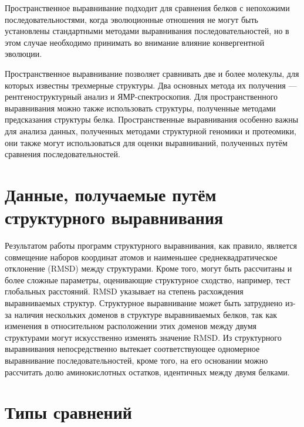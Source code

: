 \documentclass[a4paper]{extreport}
\begin{document}
Пространственное выравнивание подходит для сравнения белков с непохожими последовательностями, когда эволюционные отношения не могут быть установлены стандартными методами выравнивания последовательностей, но в этом случае необходимо принимать во внимание влияние конвергентной эволюции.

Пространственное выравнивание позволяет сравнивать две и более молекулы, для которых известны трехмерные структуры. Два основных метода их получения — рентгеноструктурный анализ и ЯМР-спектроскопия. Для пространственного выравнивания можно также использовать структуры, полученные методами предсказания структуры белка. Пространственные выравнивания особенно важны для анализа данных, полученных методами структурной геномики и протеомики, они также могут использоваться для оценки выравниваний, полученных путём сравнения последовательностей. 

\section{Данные, получаемые путём структурного выравнивания}

Результатом работы программ структурного выравнивания, как правило, является совмещение наборов координат атомов и наименьшее среднеквадратическое отклонение (RMSD) между структурами. Кроме того, могут быть рассчитаны и более сложные параметры, оценивающие структурное сходство, например, тест глобальных расстояний. RMSD указывает на степень расхождения выравниваемых структур. Структурное выравнивание может быть затруднено из-за наличия нескольких доменов в структуре выравниваемых белков, так как изменения в относительном расположении этих доменов между двумя структурами могут искусственно изменять значение RMSD. Из структурного выравнивания непосредственно вытекает соответствующее одномерное выравнивание последовательностей, кроме того, на его основании можно рассчитать долю аминокислотных остатков, идентичных между двумя белками. 

\section{Типы сравнений}
\end{document}
